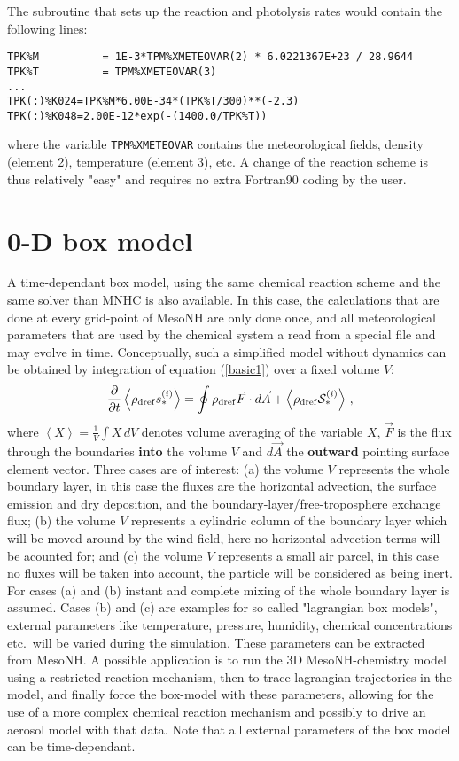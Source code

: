 The subroutine that sets up the reaction and photolysis rates would
contain the following lines:
{\small
\begin{verbatim}
TPK%M          = 1E-3*TPM%XMETEOVAR(2) * 6.0221367E+23 / 28.9644
TPK%T          = TPM%XMETEOVAR(3)
...
TPK(:)%K024=TPK%M*6.00E-34*(TPK%T/300)**(-2.3)
TPK(:)%K048=2.00E-12*exp(-(1400.0/TPK%T))
\end{verbatim}
}
where the variable {\tt TPM\%XMETEOVAR} contains the
meteorological fields, density (element 2), temperature (element 3), etc.
A change of the reaction scheme is thus relatively "easy" and requires
no extra Fortran90 coding by the user.

\section{0-D box model}
%
A time-dependant box model, using the same chemical reaction scheme
and the same solver than MNHC is also available.
In this case, the calculations that are done at every grid-point
of MesoNH are only done once, and all meteorological parameters
that are used by the chemical system a read from a special file
and may evolve in time.
Conceptually, such a simplified model without dynamics can be obtained by
integration of equation (\ref{basic1}) over a fixed volume $V$:
\begin{equation}
\frac{\partial}{\partial t} \left<\rho_{\rm dref}{s}_\ast^{(i)}\right> =  \oint \rho_{\rm dref}\vec F \cdot d\vec A
+ \left< \rho_{\rm dref} {\cal S}_\ast^{(i)} \right>
\,,
\end{equation}
%
where $ \left< X \right> = \frac1V \int X \, dV $ denotes volume averaging 
of the variable $X$, $\vec F$ is the flux through the boundaries {\bf into} the
volume $V$ and $d\vec A$ the {\bf outward} pointing surface element vector.
Three cases are of interest: 
(a) the volume $V$ represents the whole
boundary layer, in this case the fluxes are the horizontal advection,
the surface emission and dry deposition, and the boundary-layer/free-troposphere
exchange flux;
(b) the volume $V$ represents a cylindric column of the boundary layer
which will be moved around by the wind field, here no horizontal advection terms
will be acounted for; and 
(c) the volume $V$ represents a small air parcel, in this case no
fluxes will be taken into account, the particle will be considered
as being inert.
For cases (a) and (b) instant and complete mixing of the whole boundary
layer is assumed. Cases (b) and (c) are examples for
so called "lagrangian box models", external parameters like temperature,
pressure, humidity, chemical concentrations etc.\ will be 
varied during the simulation.
These parameters can be extracted from MesoNH.
A possible application is to run the 3D MesoNH-chemistry model using
a restricted reaction mechanism, then to trace lagrangian trajectories in the
model, and finally force the box-model with these parameters, allowing 
for the use of 
a more complex chemical reaction mechanism and possibly to drive an aerosol
model with that data.
Note that all external parameters of the box model can be time-dependant.

